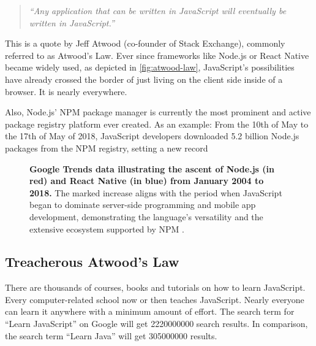 \documentclass[10pt]{article}
\begin{document}
\begin{sloppypar}
  \begin{quote}
    \emph{“Any application that can be written in JavaScript will eventually be written in JavaScript.” \citep{atwood_principle_2007}}
  \end{quote}

  This is a quote by Jeff Atwood (co-founder of Stack Exchange), commonly referred to as Atwood’s Law. Ever since frameworks like Node.js or React Native became widely used, as depicted in \autoref{fig:atwood-law}, JavaScript’s possibilities have already crossed the border of just living on the client side inside of a browser. It is nearly everywhere.

  Also, Node.js’ NPM package manager is currently the most prominent and active package registry platform ever created. As an example: From the 10th of May to the 17th of May of 2018, JavaScript developers downloaded 5.2 billion Node.js packages from the NPM registry, setting a new record \citep{npm_how_2018}

  \begin{figure}[ht]
    \centering
    \caption[Google Trends data illustrating the ascent of Node.js and React Native.]{\textbf{Google Trends data illustrating the ascent of Node.js (in red) and React Native (in blue) from January 2004 to 2018.} The marked increase aligns with the period when JavaScript began to dominate server-side programming and mobile app development, demonstrating the language's versatility and the extensive ecosystem supported by NPM \citep{google_google_nodate}.}
    \label{fig:atwood-law}
  \end{figure}

  \subsection{Treacherous Atwood’s Law}
  \label{sec:atwood-law}

  There are thousands of courses, books and tutorials on how to learn JavaScript. Every computer-related school now or then teaches JavaScript. Nearly everyone can learn it anywhere with a minimum amount of effort. The search term for “Learn JavaScript” on Google will get \num{2220000000} search results. In comparison, the search term “Learn Java” will get \num{305000000} results.


\end{sloppypar}
\end{document}
